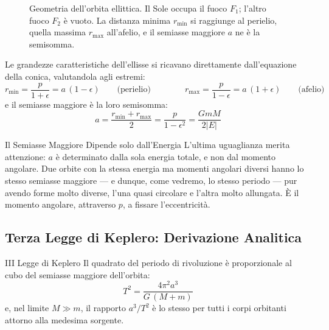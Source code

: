 \begin{figure}[ht]
    \caption{Geometria dell'orbita ellittica. Il Sole occupa il fuoco $F_1$; l'altro fuoco $F_2$ è vuoto. La distanza minima $r_{\min}$ si raggiunge al perielio, quella massima $r_{\max}$ all'afelio, e il semiasse maggiore $a$ ne è la semisomma.}
    \label{fig:geometria_ellisse}
\end{figure}

Le grandezze caratteristiche dell'ellisse si ricavano direttamente dall'equazione della conica, valutandola agli estremi:
\begin{equation}
    r_{\min} = \frac{p}{1+\epsilon} = a\,(1-\epsilon)
    \qquad \text{(perielio)}
    \qquad\qquad
    r_{\max} = \frac{p}{1-\epsilon} = a\,(1+\epsilon)
    \qquad \text{(afelio)}
\end{equation}
e il semiasse maggiore è la loro semisomma:
\begin{equation}
    a = \frac{r_{\min} + r_{\max}}{2} = \frac{p}{1-\epsilon^2} = \frac{GmM}{2|E|}
\end{equation}

\begin{osservazione}{Il Semiasse Maggiore Dipende solo dall'Energia}
L'ultima uguaglianza merita attenzione: $a$ è determinato dalla sola energia totale, e non dal momento angolare. Due orbite con la stessa energia ma momenti angolari diversi hanno lo stesso semiasse maggiore --- e dunque, come vedremo, lo stesso periodo --- pur avendo forme molto diverse, l'una quasi circolare e l'altra molto allungata. È il momento angolare, attraverso $p$, a fissare l'eccentricità.
\end{osservazione}

\subsection{Terza Legge di Keplero: Derivazione Analitica}

\begin{teorema}{III Legge di Keplero}
Il quadrato del periodo di rivoluzione è proporzionale al cubo del semiasse maggiore dell'orbita:
\begin{equation}
    T^2 = \frac{4\pi^2 a^3}{G\,(M+m)}
\end{equation}
e, nel limite $M \gg m$, il rapporto $a^3/T^2$ è lo stesso per tutti i corpi orbitanti attorno alla medesima sorgente.
\end{teorema}

